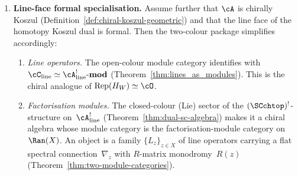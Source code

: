 \begin{theorem}
\begin{enumerate}[label=\textup{(\roman*)}]
\item \textbf{Line-face formal specialisation.}
 Assume further that\/ $\cA$ is chirally Koszul
 \textup{(}Definition~\textup{\ref{def:chiral-koszul-geometric})}
 and that the line face of the homotopy Koszul dual is formal. Then
 the two-colour package simplifies accordingly:
 \begin{enumerate}[label=\textup{(\alph*)}]
 \item \emph{Line operators.}
 The open-colour module category identifies with
 $\cC_{\mathrm{line}} \simeq \cA^!_{\mathrm{line}}\textup{-}\mathbf{mod}$
 \textup{(}Theorem~\textup{\ref{thm:lines_as_modules})}.
 This is the chiral analogue of
 $\operatorname{Rep}(H_W) \simeq \cO$.
 \item \emph{Factorisation modules.}
 The closed-colour (Lie) sector of the $(\SCchtop)^{!}$-structure on~$\cA^!_{\mathrm{line}}$
 \textup{(}Theorem~\textup{\ref{thm:dual-sc-algebra})}
 makes it a chiral algebra whose module category is the
 factorisation-module category on~$\Ran(X)$. An object
 is a family $\{L_z\}_{z \in X}$ of line operators
 carrying a flat spectral connection~$\nabla_z$ with
 $R$-matrix monodromy~$R(z)$
 \textup{(}Theorem~\textup{\ref{thm:two-module-categories})}.
 \end{enumerate}


\end{enumerate}
\end{theorem}
